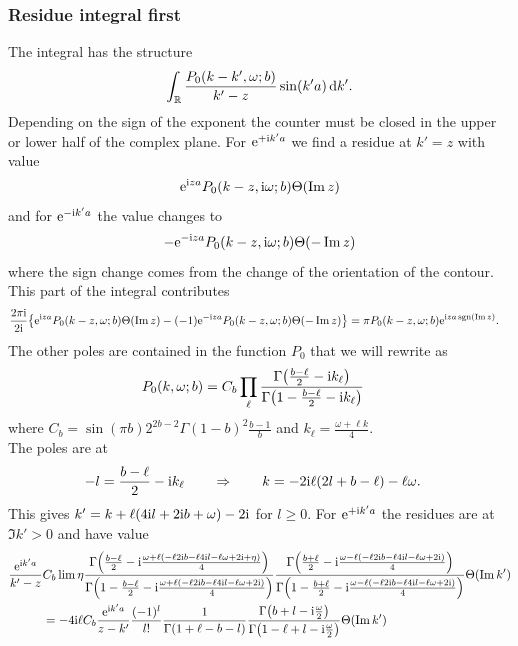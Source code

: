 \documentclass[english, parskip=full]{scrartcl}
\begin{document}
\subsubsection{Residue integral first}
The integral has the structure
\begin{align}
\int_{\mathbb{R}} \frac{P_0(k-k',\omega; b)}{k'-z} \sin(k'a) \, \mathrm{d}k'.
\end{align}
Depending on the sign of the exponent the counter must be closed in the upper or lower half of the complex plane.
For $\text{e}^{+\text{i} k' a}$ we find a residue at $k'=z$ with value
\begin{align}
\text{e}^{\text{i} za} P_0(k-z,\text{i}\omega; b) \Theta(\Im z)
\end{align}
and for $\text{e}^{-\text{i} k'a}$ the value changes to
\begin{align}
-\text{e}^{-\text{i} za} P_0(k-z,\text{i}\omega; b)\Theta(-\Im z)
\end{align}
where the sign change comes from the change of the orientation of the contour.
This part of the integral contributes
\begin{align}
\frac{2\pi\i}{2\i} \klc*{\powe{\i za} P_0(k-z,\omega; b) \Theta(\Im z) - (-1) \powe{-\i za} P_0(k-z,\omega; b)\Theta(-\Im z)} &= \pi P_0(k-z,\omega; b) \powe{\i za \sgn(\Im z)}.
\end{align}
The other poles are contained in the function $P_0$ that we will rewrite as
\begin{align}
P_0(k,\omega;b) &= C_b \prod_\ell \frac{\Gamma\kla*{\frac{b-\ell}{2} - \i k_\ell}}{\Gamma\kla*{1 - \frac{b-\ell}{2} - \i k_\ell}}
\end{align}
where $C_b = \sin(\pi b)2^{2b-2} \Gamma(1-b)^2 \frac{b-1}{b}$ and $k_\ell = \frac{\omega + \ell k}{4}$.\\
The poles are at
\begin{align}
-l &= \frac{b-\ell}{2} - \text{i} k_\ell \qquad \Rightarrow\qquad k = -2\text{i}\ell (2l+b-\ell) - \ell\omega.
\end{align}
This gives $k'=k+\ell(4\text{i} l + 2\text{i} b + \omega) - 2\text{i}$ for $l\ge 0$.
For $\text{e}^{+\text{i} k'a}$ the residues are at $\Im k' > 0$ and have value
\begin{align}
\frac{\powe{\i k'a}}{k'-z} &C_b \lim \eta\frac{\Gamma\kla*{\frac{b-\ell}{2} - \i \frac{\omega + \ell(-\ell 2\i b -\ell 4\i l - \ell \omega + 2\i + \eta)}{4}}}{\Gamma\kla*{1-\frac{b-\ell}{2} - \i \frac{\omega + \ell(-\ell 2\i b -\ell 4\i l - \ell \omega+ 2\i)}{4}}} \frac{\Gamma\kla*{\frac{b+\ell}{2} - \i \frac{\omega - \ell(-\ell 2\i b -\ell 4\i l - \ell \omega + 2\i)}{4}}}{\Gamma\kla*{1-\frac{b+\ell}{2} - \i \frac{\omega - \ell(-\ell 2\i b -\ell 4\i l - \ell \omega+ 2\i)}{4}}} \Theta(\Im k')\\
&= -4\i\ell C_b \frac{\powe{\i k' a}}{z - k'} \frac{(-1)^l}{l!} \frac{1}{\Gamma(1+\ell -b-l)} \frac{\Gamma\kla*{b + l-\i\frac{\omega}{2}}}{\Gamma\kla*{1-\ell+l-\i\frac{\omega}{2}}} \Theta(\Im k')
\end{align}
\end{document}
